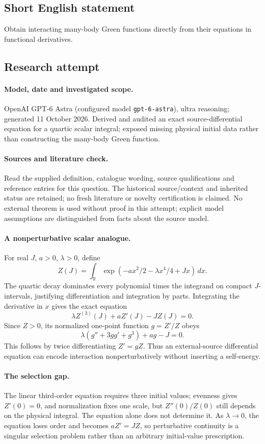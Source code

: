 \documentclass[11pt]{article}
\begin{document}
\subsection{Short English statement}
Obtain interacting many-body Green functions directly from their equations in functional derivatives.
\subsection{Research attempt}
\paragraph{Model, date and investigated scope.}
OpenAI GPT-6 Astra (configured model \texttt{gpt-6-astra}), ultra reasoning; generated 11 October 2026. Derived and audited an exact source-differential equation for a quartic scalar integral; exposed missing physical initial data rather than constructing the many-body Green function.

\paragraph{Sources and literature check.}
Read the supplied definition, catalogue wording, source qualifications and reference entries for this question. The historical source/context and inherited status are retained; no fresh literature or novelty certification is claimed. No external theorem is used without proof in this attempt; explicit model assumptions are distinguished from facts about the source model.

\paragraph{A nonperturbative scalar analogue.} For real \(J\), \(a>0\), \(\lambda>0\), define
\[
 Z(J)=\int_{\mathbb R}\exp(-ax^2/2-\lambda x^4/4+Jx)\,dx.
\]
The quartic decay dominates every polynomial times the integrand on compact \(J\)-intervals, justifying differentiation and integration by parts. Integrating the derivative in \(x\) gives the exact equation
\[
 \lambda Z^{(3)}(J)+aZ'(J)-JZ(J)=0.
\]
Since \(Z>0\), its normalized one-point function \(g=Z'/Z\) obeys
\[
 \lambda(g''+3gg'+g^3)+ag-J=0.
\]
This follows by twice differentiating \(Z'=gZ\). Thus an external-source differential equation can encode interaction nonperturbatively without inserting a self-energy.
\paragraph{The selection gap.} The linear third-order equation requires three initial values; evenness gives \(Z'(0)=0\), and normalization fixes one scale, but \(Z''(0)/Z(0)\) still depends on the physical integral. The equation alone does not determine it. As \(\lambda\to0\), the equation loses order and becomes \(aZ'=JZ\), so perturbative continuity is a singular selection problem rather than an arbitrary initial-value prescription.
\end{document}
